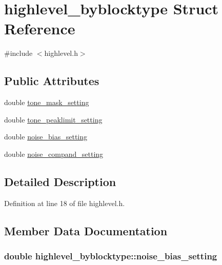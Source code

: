 \hypertarget{structhighlevel__byblocktype}{}\section{highlevel\+\_\+byblocktype Struct Reference}
\label{structhighlevel__byblocktype}


{\ttfamily \#include $<$highlevel.\+h$>$}

\subsection*{Public Attributes}
\begin{DoxyCompactItemize}
\item 
double \hyperlink{structhighlevel__byblocktype_a4ddd74f9ea85b93e0f8a81da2321dbdd}{tone\+\_\+mask\+\_\+setting}
\item 
double \hyperlink{structhighlevel__byblocktype_af7bf4884a347918e37addd21418be5f6}{tone\+\_\+peaklimit\+\_\+setting}
\item 
double \hyperlink{structhighlevel__byblocktype_ac714cd2ec5928ac5f90de7ce61b21891}{noise\+\_\+bias\+\_\+setting}
\item 
double \hyperlink{structhighlevel__byblocktype_a30f1f5f31f0948659f7739541c68273b}{noise\+\_\+compand\+\_\+setting}
\end{DoxyCompactItemize}


\subsection{Detailed Description}


Definition at line 18 of file highlevel.\+h.



\subsection{Member Data Documentation}
\subsubsection[{\texorpdfstring{noise\+\_\+bias\+\_\+setting}{noise_bias_setting}}]{\setlength{\rightskip}{0pt plus 5cm}double highlevel\+\_\+byblocktype\+::noise\+\_\+bias\+\_\+setting}\hypertarget{structhighlevel__byblocktype_ac714cd2ec5928ac5f90de7ce61b21891}{}\label{structhighlevel__byblocktype_ac714cd2ec5928ac5f90de7ce61b21891}


